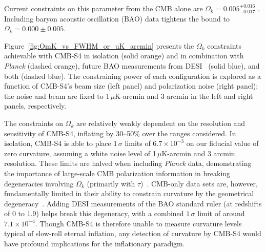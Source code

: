 Current constraints on this parameter from the CMB alone are $\Omega_k= 0.005^{+0.016}_{-0.017}$ \cite{Ade:2015xua}. Including baryon acoustic oscillation (BAO) data tightens the bound to $\Omega_k=0.000\pm0.005$.%

Figure~\ref{fig:OmK_vs_FWHM_or_uK_arcmin} presents the $\Omega_k$ constraints achievable with CMB-S4 in isolation (solid orange) and in combination with {\it Planck\/} (dashed orange), future BAO measurements from DESI~\cite{Font-Ribera:2013rwa} (solid blue), and both (dashed blue). The constraining power of each configuration is explored as a function of CMB-S4's beam size (left panel) and polarization noise (right panel); the noise and beam are fixed to 1$\,\mu$K-arcmin and 3 arcmin in the left and right panels, respectively.

The constraints on $\Omega_k$ are relatively weakly dependent on the resolution and sensitivity of CMB-S4, inflating by 30--50\% over the ranges considered. In isolation, CMB-S4 is able to place $1\,\sigma$ limits of $6.7\times10^{-3}$ on our fiducial value of zero curvature, assuming a white noise level of 1$\,\mu$K-arcmin and 3 arcmin resolution. These limits are halved when including {\it Planck\/} data, demonstrating the importance of large-scale CMB polarization information in breaking degeneracies involving $\Omega_k$ (primarily with $\tau$)~\cite{Leonard:2016evk}. CMB-only data sets are, however, fundamentally limited in their ability to constrain curvature by the geometrical degeneracy~\cite{Zaldarriaga:1997ch,Bond:1997wr}. Adding DESI measurements of the BAO standard ruler (at redshifts of 0 to 1.9) helps break this degeneracy, with a combined $1\,\sigma$ limit of around $7.1\times10^{-4}$. Though CMB-S4 is therefore unable to measure curvature levels typical of slow-roll eternal inflation, any detection of curvature by CMB-S4 would have profound implications for the inflationary paradigm.

